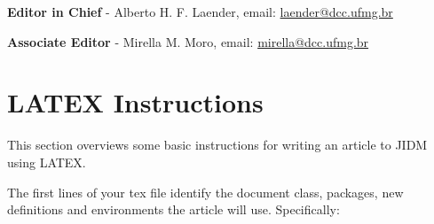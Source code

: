\documentclass[jidm,a4paper]{jidm} %
\begin{document}
\textbf{Editor in Chief} - Alberto H. F. Laender, email: \url{laender@dcc.ufmg.br}

\textbf{Associate Editor} -	Mirella M. Moro, email: \url{mirella@dcc.ufmg.br}

\appendix
\section{LATEX Instructions}

This section overviews some basic instructions for writing an article to JIDM using LATEX.


The first lines of your tex file identify the document class, packages, new definitions and environments the article will use.
Specifically:
\end{document}
